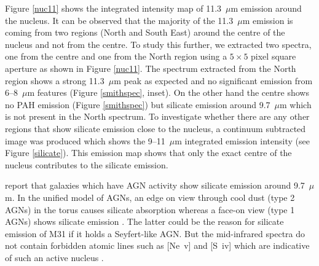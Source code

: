
%
Figure \ref{nuc11} shows the integrated intensity map of 11.3~$\mu$m emission around the nucleus. It can be observed that the majority of the 11.3~$\mu$m 
emission is coming from two regions (North and South East) around the centre of the nucleus and not from the centre. To study this further, we extracted two 
spectra, one from the centre and one from the North region using a $5 \times 5$ pixel square aperture as shown in Figure \ref{nuc11}. The spectrum extracted 
from the North region shows a strong 11.3~$\mu$m peak as expected and no significant emission from 6--8~$\mu$m features (Figure \ref{smithspec}, inset). 
On the other hand the centre shows no PAH emission (Figure \ref{smithspec}) but silicate emission around 9.7~$\mu$m which is not present in the North spectrum. 
To investigate whether there are any other regions that show silicate emission close to the nucleus, a continuum subtracted image was produced which shows the 
9--11~$\mu$m integrated emission intensity (see Figure \ref{silicate}). This emission map shows that only the exact centre of the nucleus contributes 
to the silicate emission. 

\citet{Spoon2007} report that galaxies which have AGN activity show silicate emission around 9.7~$\mu$m.
In the unified model of AGNs, an edge on view through cool dust (type 2 AGNs) in the torus causes silicate absorption whereas a face-on view (type 1 AGNs) 
shows silicate emission \citep{AGNtypes1995}. The latter could be the reason for silicate emission of M31 if it holds a Seyfert-like AGN. 
But the mid-infrared spectra do not contain forbidden atomic lines such as [Ne~{\sc v}] and [S~{\sc iv}] which are indicative of such an active nucleus \citep{AGNref}.

